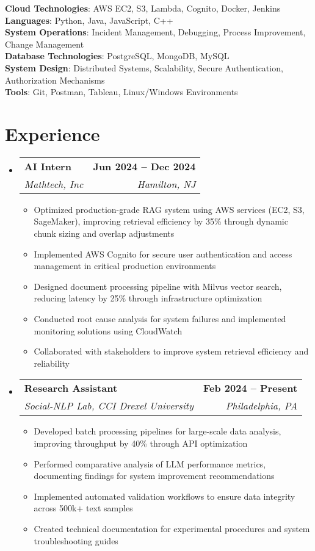 \documentclass[letterpaper,11pt]{article}
\makeatletter
\newcommand{\resumeItem}[1]{
  \item\small{
    {#1 \vspace{-2pt}}
  }
}
\newcommand{\resumeSubheading}[4]{
  \vspace{-2pt}\item
    \begin{tabular*}{1.0\textwidth}[t]{l@{\extracolsep{\fill}}r}
      \textbf{#1} & \textbf{\small #2} \\
      \textit{\small#3} & \textit{\small #4} \\
    \end{tabular*}\vspace{-7pt}
}
\newcommand{\resumeSubHeadingListStart}{\begin{itemize}[leftmargin=0.0in, label={}]}
\newcommand{\resumeSubHeadingListEnd}{\end{itemize}}
\newcommand{\resumeItemListStart}{\begin{itemize}}
\newcommand{\resumeItemListEnd}{\end{itemize}\vspace{-5pt}}
\makeatother
\begin{document}
\begin{itemize}[leftmargin=0.15in, label={}]
	\small{\item{
		\textbf{Cloud Technologies}{: AWS EC2, S3, Lambda, Cognito, Docker, Jenkins} \\
		\textbf{Languages}{: Python, Java, JavaScript, C++} \\
		\textbf{System Operations}{: Incident Management, Debugging, Process Improvement, Change Management} \\
		\textbf{Database Technologies}{: PostgreSQL, MongoDB, MySQL} \\
		\textbf{System Design}{: Distributed Systems, Scalability, Secure Authentication, Authorization Mechanisms} \\
            \textbf{Tools}{: Git, Postman, Tableau, Linux/Windows Environments}}
	}
\end{itemize}
\vspace{-22pt}

\section{Experience}
  \resumeSubHeadingListStart
    \resumeSubheading
    {AI Intern}{Jun 2024 -- Dec 2024}
    {Mathtech, Inc}{Hamilton, NJ}
    \resumeItemListStart
        \resumeItem{Optimized production-grade RAG system using AWS services (EC2, S3, SageMaker), improving retrieval efficiency by 35\% through dynamic chunk sizing and overlap adjustments}
        \resumeItem{Implemented AWS Cognito for secure user authentication and access management in critical production environments}
        \resumeItem{Designed document processing pipeline with Milvus vector search, reducing latency by 25\% through infrastructure optimization}
        \resumeItem{Conducted root cause analysis for system failures and implemented monitoring solutions using CloudWatch}
        \resumeItem{Collaborated with stakeholders to improve system retrieval efficiency and reliability}
    \resumeItemListEnd
    \resumeSubheading
    {Research Assistant}{Feb 2024 -- Present}
    {Social-NLP Lab, CCI Drexel University}{Philadelphia, PA}
    \resumeItemListStart
        \resumeItem{Developed batch processing pipelines for large-scale data analysis, improving throughput by 40\% through API optimization}
        \resumeItem{Performed comparative analysis of LLM performance metrics, documenting findings for system improvement recommendations}
        \resumeItem{Implemented automated validation workflows to ensure data integrity across 500k+ text samples}
        \resumeItem{Created technical documentation for experimental procedures and system troubleshooting guides}
    \resumeItemListEnd
\resumeSubHeadingListEnd
\vspace{-15pt}
\end{document}
